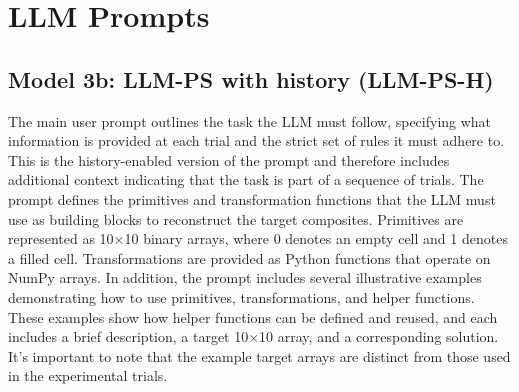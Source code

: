 \documentclass{article}
\begin{document}
\clearpage


\section{LLM Prompts}\label{si:prompts}




\subsection{Model 3b: LLM-PS with history (LLM-PS-H)}

The main user prompt outlines the task the LLM must follow, specifying what information is provided at each trial and the strict set of rules it must adhere to. This is the history-enabled version of the prompt and therefore includes additional context indicating that the task is part of a sequence of trials. The prompt defines the primitives and transformation functions that the LLM must use as building blocks to reconstruct the target composites. Primitives are represented as 10×10 binary arrays, where 0 denotes an empty cell and 1 denotes a filled cell. Transformations are provided as Python functions that operate on NumPy arrays. In addition, the prompt includes several illustrative examples demonstrating how to use primitives, transformations, and helper functions. These examples show how helper functions can be defined and reused, and each includes a brief description, a target 10×10 array, and a corresponding solution. It's important to note that the example target arrays are distinct from those used in the experimental trials.
\end{document}
